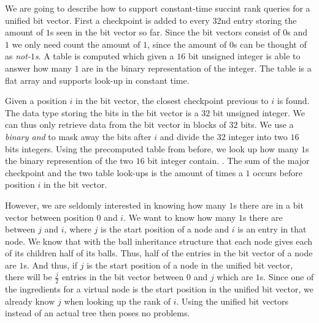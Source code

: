 We are going to describe how to support constant-time succint rank queries for a unified bit vector. First a checkpoint is added to every 32nd entry storing the amount of $1$s seen in the bit vector so far. Since the bit vectors consist of $0$s and $1$ we only need count the amount of $1$, since the amount of $0$s can be thought of as \emph{not-$1$s}. A table is computed which given a $16$ bit unsigned integer is able to answer how many $1$ are in the binary representation of the integer. The table is a flat array and supports look-up in constant time.

Given a position $i$ in the bit vector, the closest checkpoint previous to $i$ is found. The data type storing the bits in the bit vector is a $32$ bit unsigned integer. We can thus only retrieve data from the bit vector in blocks of $32$ bits. We use a \emph{binary and} to mask away the bits after $i$ and divide the $32$ integer into two $16$ bits integers. Using the precomputed table from before, we look up how many $1$s the binary represention of the two $16$ bit integer contain. . The sum of the major checkpoint and the two table look-ups is the amount of times a $1$ occurs before position $i$ in the bit vector. 

However, we are seldomly interested in knowing how many $1$s there are in a bit vector between position $0$ and $i$. We want to know how many $1$s there are between $j$ and $i$, where $j$ is the start position of a node and $i$ is an entry in that node. We know that with the ball inheritance structure that each node gives each of its children half of its balls. Thus, half of the entries in the bit vector of a node are $1$s. And thus, if $j$ is the start position of a node in the unified bit vector, there will be $\frac{j}{2}$ entries in the bit vector between $0$ and $j$ which are $1$s. Since one of the ingredients for a virtual node is the start position in the unified bit vector, we already know $j$ when looking up the rank of $i$. Using the unified bit vectors instead of an actual tree then poses no problems.

